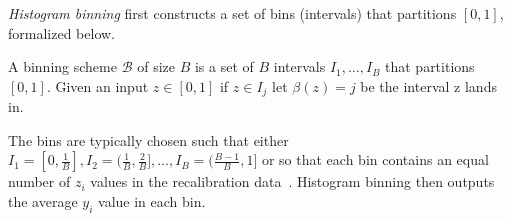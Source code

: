 \emph{Histogram binning} first constructs a set of bins (intervals) that partitions $[0, 1]$, formalized below.

\begin{definition}
A binning scheme $\mathcal{B}$ of size $B$ is a set of $B$ intervals $I_1, \dots, I_B$ that partitions $[0, 1]$. Given an input $z \in [0, 1]$ if $z \in I_j$ let $\beta(z) = j$ be the interval z lands in.
\end{definition}

The bins are typically chosen such that either $I_1 = [0, \frac{1}{B}], I_2 = (\frac{1}{B}, \frac{2}{B}], \dots, I_B = (\frac{B-1}{B}, 1]$  or so that each bin contains an equal number of $z_i$ values in the recalibration data~\cite{zadrozny2001calibrated, guo2017calibration}. Histogram binning then outputs the average $y_i$ value in each bin.
